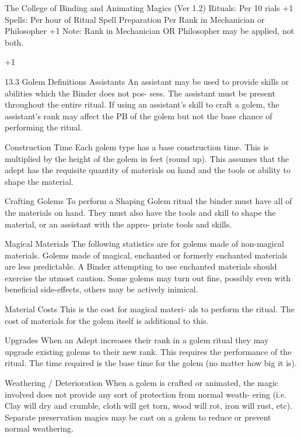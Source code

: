 \begin{Chapter}{The College of Binding and Animating Magics (Ver 1.2)}
Rituals: Per 10%
rials 
+1 
Spells: Per hour of Ritual Spell Preparation 
Per Rank in Mechanician or Philosopher 
+1 
Note:  Rank  in  Mechanician  OR  Philosopher  may 
be applied, not both. 

+1 

13.3 Golem Definitions 
Assistants  An  assistant  may  be  used  to  provide 
skills  or  abilities  which  the  Binder  does  not  pos-
sess.  The  assistant  must  be  present  throughout  the 
entire  ritual.  If  using  an  assistant’s  skill  to  craft  a 
golem, the assistant’s rank may affect the PB of the 
golem  but  not  the  base  chance  of  performing  the 
ritual. 

Construction  Time  Each  golem  type  has  a  base 
construction time.  This  is  multiplied by  the  height 
of the golem in feet (round up). This assumes that 
the adept has the requisite quantity of materials on 
hand and the tools or ability to shape the material. 

Crafting  Golems  To  perform  a  Shaping  Golem 
ritual  the  binder  must  have  all  of  the  materials  on 
hand.  They  must  also  have  the  tools  and  skill  to 
shape  the  material,  or  an  assistant  with  the  appro-
priate tools and skills. 

Magical Materials The following statistics are for 
golems  made  of  non-magical  materials.  Golems 
made of magical, enchanted or formerly enchanted 
materials are less predictable. A Binder attempting 
to  use  enchanted  materials  should  exercise  the 
utmost  caution.  Some  golems  may  turn  out  fine, 
possibly  even  with  beneficial  side-effects,  others 
may be actively inimical. 

Material Costs This is the cost for magical materi-
als  to  perform  the  ritual.  The  cost  of  materials  for 
the golem itself is additional to this. 

Upgrades When an Adept increases their rank in a 
golem  ritual  they  may  upgrade  existing  golems  to 
their  new  rank.  This  requires  the  performance  of 
the ritual. The time required is the base time for the 
golem (no matter how big it is). 

Weathering  /  Deterioration  When  a  golem  is 
crafted  or  animated,  the  magic  involved  does  not 
provide any sort of protection from normal weath-
ering (i.e. Clay will dry and crumble, cloth will get 
torn,  wood  will  rot,  iron  will  rust,  etc).  Separate 
preservation  magics  may  be  cast  on  a  golem  to 
reduce or prevent normal weathering. 


\end{Chapter}
